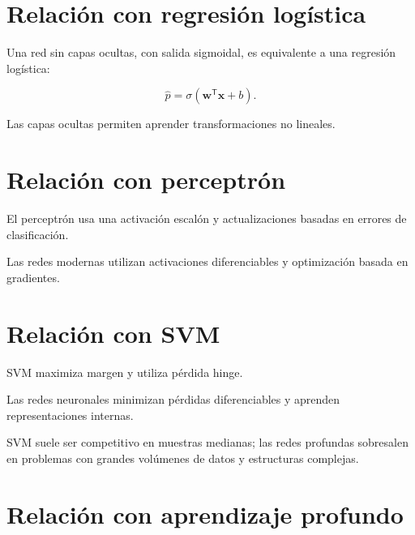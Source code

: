 \documentclass[
  spanish,
  10.5pt,
  letterpaper,
  DIV=11,
  numbers=noendperiod,
  oneside,
  open=any]{scrreprt}
\theoremstyle{definition}
\theoremstyle{definition}
\theoremstyle{plain}
\theoremstyle{remark}
\begin{document}
\section*{Relación con regresión
logística}\label{relaciuxf3n-con-regresiuxf3n-loguxedstica-5}


Una red sin capas ocultas, con salida sigmoidal, es equivalente a una
regresión logística:

\[
\widehat{p}
=
\sigma
\left(
\mathbf{w}^{\mathsf T}\mathbf{x}+b
\right).
\]

Las capas ocultas permiten aprender transformaciones no lineales.

\section*{Relación con
perceptrón}\label{relaciuxf3n-con-perceptruxf3n-1}


El perceptrón usa una activación escalón y actualizaciones basadas en
errores de clasificación.

Las redes modernas utilizan activaciones diferenciables y optimización
basada en gradientes.

\section*{Relación con SVM}\label{relaciuxf3n-con-svm-1}


SVM maximiza margen y utiliza pérdida hinge.

Las redes neuronales minimizan pérdidas diferenciables y aprenden
representaciones internas.

SVM suele ser competitivo en muestras medianas; las redes profundas
sobresalen en problemas con grandes volúmenes de datos y estructuras
complejas.

\section*{Relación con aprendizaje
profundo}\label{relaciuxf3n-con-aprendizaje-profundo}
\end{document}
